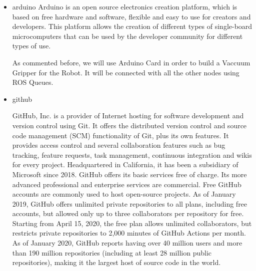 \begin{itemize}
	\item[\textendash]arduino
		Arduino is an open source electronics creation platform, which is based on free hardware and software, flexible and easy to use for creators and developers. This platform allows the creation of different types of single-board microcomputers that can be used by the developer community for different types of use.

		As commented before, we will use Arduino Card in order to build a Vaccuum Gripper for the Robot. It will be connected with all the other nodes using ROS Queues.


	\item[\textendash]github
	
			GitHub, Inc. is a provider of Internet hosting for software development and version control using Git. It offers the distributed version control and source code management (SCM) functionality of Git, plus its own features. It provides access control and several collaboration features such as bug tracking, feature requests, task management, continuous integration and wikis for every project. Headquartered in California, it has been a subsidiary of Microsoft since 2018.
		GitHub offers its basic services free of charge. Its more advanced professional and enterprise services are commercial. Free GitHub accounts are commonly used to host open-source projects. As of January 2019, GitHub offers unlimited private repositories to all plans, including free accounts, but allowed only up to three collaborators per repository for free. Starting from April 15, 2020, the free plan allows unlimited collaborators, but restricts private repositories to 2,000 minutes of GitHub Actions per month. As of January 2020, GitHub reports having over 40 million users  and more than 190 million repositories  (including at least 28 million public repositories),  making it the largest host of source code in the world.


\end{itemize}
